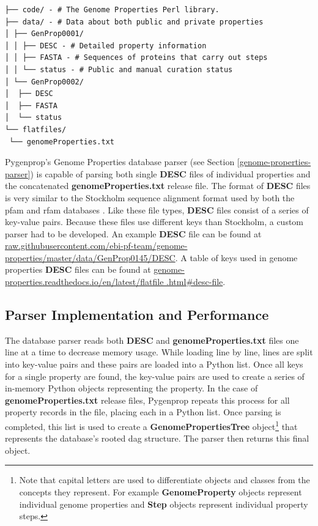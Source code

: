 \begin{verbatim}
├── code/ - # The Genome Properties Perl library.
├── data/ - # Data about both public and private properties
│ ├── GenProp0001/
│ │ ├── DESC - # Detailed property information
│ │ ├── FASTA - # Sequences of proteins that carry out steps
│ │ └── status - # Public and manual curation status
│ └── GenProp0002/
│  ├── DESC
│  ├── FASTA
│  └── status
└── flatfiles/
 └── genomeProperties.txt
\end{verbatim}

Pygenprop's Genome Properties database parser (see Section 
\ref{genome-properties-parser}) is capable of parsing both single \textbf{DESC} 
files of individual properties and the concatenated 
\textbf{genomeProperties.txt} release file. The format of \textbf{DESC} files is 
very similar to the Stockholm sequence alignment format used by both the 
\gls{pfam} and \gls{rfam} databases \cite{bateman2004pfam, griffiths2003rfam}. Like 
these file types, \textbf{DESC} files consist of a series of key-value pairs. 
Because these files use different keys than Stockholm, a custom parser had to be 
developed. An example \textbf{DESC} file can be found at 
\href{http://raw.githubusercontent.com/ebi-pf-team/genome-properties/master/data/GenProp0145/DESC}{raw.githubusercontent.com/ebi-pf-team/genome-properties/master/data/GenProp0145/DESC}. 
A table of keys used in  genome properties \textbf{DESC} files can be found at 
\href{https://genome-properties.readthedocs.io/en/latest/flatfile.html#desc-file}{genome-properties.readthedocs.io/en/latest/flatfile .html\#desc-file}.

\subsection{Parser Implementation and Performance}

The database parser reads both \textbf{DESC} and \textbf{genomeProperties.txt} 
files one line at a time to decrease memory usage. While loading line by line, 
lines are split into key-value pairs and these pairs are loaded into a Python 
list. Once all keys for a single property are found, the key-value pairs are 
used to create a series of in-memory Python objects representing the property. 
In the case of \textbf{genomeProperties.txt} release files, Pygenprop repeats 
this process for all property records in the file, placing each in a Python 
list.  Once parsing is completed, this list is used to create a 
\textbf{GenomePropertiesTree} object\footnote{Note that capital letters are used 
to differentiate objects and classes from the concepts they represent. For 
example \textbf{GenomeProperty} objects represent individual genome properties 
and \textbf{Step} objects represent individual property steps.} that represents 
the database's rooted \gls{dag} structure. The parser then returns this final 
object.

